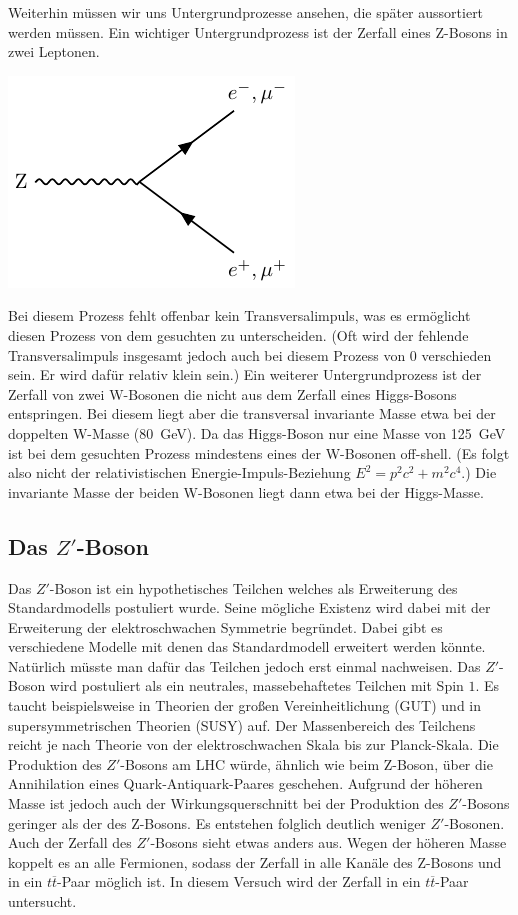 Weiterhin müssen wir uns Untergrundprozesse ansehen, die später aussortiert werden müssen.
Ein wichtiger Untergrundprozess ist der Zerfall eines Z-Bosons in zwei Leptonen.
\begin{center}
\includegraphics{../Pictures/generate_feynman_Zll/Zll-feynman.pdf}
\label{Zll}
\end{center}
Bei diesem Prozess fehlt offenbar kein Transversalimpuls, was es ermöglicht diesen Prozess von dem gesuchten zu unterscheiden.
(Oft wird der fehlende Transversalimpuls insgesamt jedoch auch bei diesem Prozess von $0$ verschieden sein. Er wird dafür relativ klein sein.)
Ein weiterer Untergrundprozess ist der Zerfall von zwei W-Bosonen die nicht aus dem Zerfall eines Higgs-Bosons entspringen.
Bei diesem liegt aber die transversal invariante Masse etwa bei der doppelten W-Masse (\SI{80}{\giga\electronvolt}).
Da das Higgs-Boson nur eine Masse von \SI{125}{\giga\electronvolt} ist bei dem gesuchten Prozess mindestens eines der W-Bosonen off-shell. (Es folgt also nicht der relativistischen Energie-Impuls-Beziehung $E^{2} = p^{2}c^{2} + m^{2}c^{4}$.)
Die invariante Masse der beiden W-Bosonen liegt dann etwa bei der Higgs-Masse.

\subsection{Das $Z'$-Boson}
Das $Z'$-Boson ist ein hypothetisches Teilchen welches als Erweiterung des Standardmodells postuliert wurde.
Seine mögliche Existenz wird dabei mit der Erweiterung der elektroschwachen Symmetrie begründet.
Dabei gibt es verschiedene Modelle mit denen das Standardmodell erweitert werden könnte.
Natürlich müsste man dafür das Teilchen jedoch erst einmal nachweisen.
Das $Z'$-Boson wird postuliert als ein neutrales, massebehaftetes Teilchen mit Spin $1$.
Es taucht beispielsweise in Theorien der großen Vereinheitlichung (GUT) und in supersymmetrischen Theorien (SUSY) auf.
Der Massenbereich des Teilchens reicht je nach Theorie von der elektroschwachen Skala bis zur Planck-Skala.
Die Produktion des $Z'$-Bosons am LHC würde, ähnlich wie beim Z-Boson, über die Annihilation eines Quark-Antiquark-Paares geschehen.
Aufgrund der höheren Masse ist jedoch auch der Wirkungsquerschnitt bei der Produktion des $Z'$-Bosons geringer als der des Z-Bosons.
Es entstehen folglich deutlich weniger $Z'$-Bosonen.
Auch der Zerfall des $Z'$-Bosons sieht etwas anders aus.
Wegen der höheren Masse koppelt es an alle Fermionen, sodass der Zerfall in alle Kanäle des Z-Bosons und in ein $t\overline{t}$-Paar möglich ist.
In diesem Versuch wird der Zerfall in ein $t\overline{t}$-Paar untersucht.

